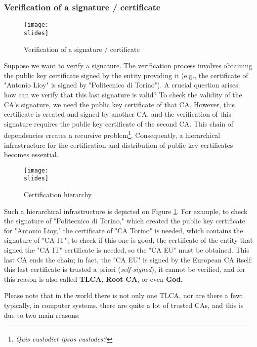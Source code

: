 \subsubsection{Verification of a signature / certificate}

\begin{figure}[h]
    \centering
    \texttt{[image: \\slides]}
    \caption{Verification of a signature / certificate}
\end{figure}

Suppose we want to verify a signature. The verification process involves obtaining the public key certificate signed by the entity providing it (e.g., the certificate of "Antonio Lioy" is signed by "Politecnico di Torino"). A crucial question arises: how can we verify that this last signature is valid? To check the validity of the CA's signature, we need the public key certificate of that CA. However, this certificate is created and signed by another CA, and the verification of this signature requires the public key certificate of the second CA. This chain of dependencies creates a recursive problem\footnote{\textit{Quis custodiet ipsos custodes?}}. 
Consequently, a hierarchical infrastructure for the certification and distribution of public-key certificates becomes essential.


\begin{figure}[h]
    \centering
    \texttt{[image: \\slides]}
    \caption{Certification hierarchy}
    \label{fig:certification-hierarchy}
\end{figure}

Such a hierarchical infrastructure is depicted on Figure \ref{fig:certification-hierarchy}. 
For example, to check the signature of "Politecnico di Torino," which created the public key certificate for "Antonio Lioy," the certificate of "CA Torino" is needed, which contains the signature of "CA IT"; to check if this one is good, the certificate of the entity that signed the "CA IT" certificate is needed, so the "CA EU" must be obtained. 
This last CA ends the chain; in fact, the "CA EU" is signed by the European CA itself: this last certificate is trusted a priori (\textit{self-signed}), it cannot be verified, and for this reason is also called \textbf{TLCA}, \textbf{Root CA}, or even \textbf{God}.

Please note that in the world there is not only one TLCA, nor are there a few: typically, in computer systems, there are quite a lot of trusted CAs, and this is due to two main reasons:

